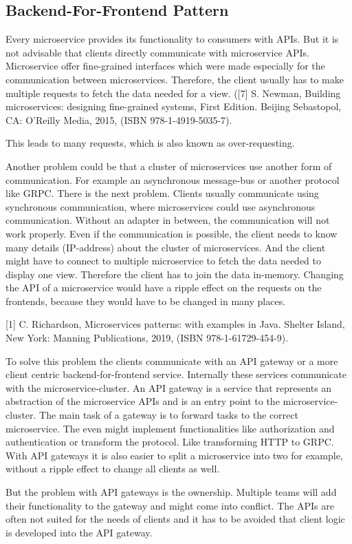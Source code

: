 \subsection{Backend-For-Frontend Pattern}

Every microservice provides its functionality to consumers with APIs. But it is not advisable that clients directly communicate with microservice APIs. Microservice offer fine-grained interfaces which were made especially for the communication between microservices. Therefore, the client usually has to make multiple requests to fetch the data needed for a view. ([7] S. Newman, Building microservices: designing fine-grained systems, First Edition. Beijing Sebastopol, CA: O’Reilly Media, 2015, (ISBN 978-1-4919-5035-7).

This leads to many requests, which is also known as over-requesting.

Another problem could be that a cluster of microservices use another form of communication. For example an asynchronous message-bus or another protocol like GRPC. There is the next problem. Clients usually communicate using synchronous communication, where microservices could use asynchronous communication. Without an adapter in between, the communication will not work properly. Even if the communication is possible, the client needs to know many details (IP-address) about the cluster of microservices. And the client might have to connect to multiple microservice to fetch the data needed to display one view. Therefore the client has to join the data in-memory. Changing the API of a microservice would have a ripple effect on the requests on the frontends, because they would have to be changed in many places.

[1] C. Richardson, Microservices patterns: with examples in Java. Shelter Island, New York: Manning Publications, 2019, (ISBN 978-1-61729-454-9).

To solve this problem the clients communicate with an API gateway or a more client centric backend-for-frontend service. Internally these services communicate with the microservice-cluster. An API gateway is a service that represents an abstraction of the microservice APIs and is an entry point to the microservice-cluster. The main task of a gateway is to forward tasks to the correct microservice. The even might implement functionalities like authorization and authentication or transform the protocol. Like transforming HTTP to GRPC. With API gateways it is also easier to split a microservice into two for example, without a ripple effect to change all clients as well.

But the problem with API gateways is the ownership. Multiple teams will add their functionality to the gateway and might come into conflict. The APIs are often not suited for the needs of clients and it has to be avoided that client logic is developed into the API gateway.
